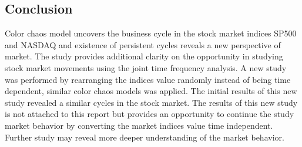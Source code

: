 \subsection{Conclusion}
Color chaos model uncovers the business cycle in the stock market indices SP500 and NASDAQ and existence of persistent cycles reveals a new perspective of market. The study provides additional clarity on the opportunity in studying stock market movements using the joint time frequency analysis. A new study was performed by rearranging the indices value randomly instead of being time dependent, similar color chaos models was applied. The initial results of this new study revealed a similar cycles in the stock market. The results of this new study is not attached to this report but provides an opportunity to continue the study market behavior by converting the market indices value time independent. Further study may reveal more deeper understanding of the market behavior.

